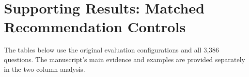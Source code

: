 \documentclass[11pt]{article}
\begin{document}
\onecolumn
\section*{Supporting Results: Matched Recommendation Controls}
The tables below use the original evaluation configurations and all 3,386 questions.
The manuscript's main evidence and examples are provided separately in the two-column analysis.

\end{document}
